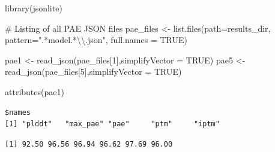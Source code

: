 \documentclass[
  letterpaper,
  DIV=11,
  numbers=noendperiod]{scrartcl}
\newenvironment{Shaded}{\begin{snugshade}}{\end{snugshade}}
\newcommand{\AttributeTok}[1]{\textcolor[rgb]{0.40,0.45,0.13}{#1}}
\newcommand{\CommentTok}[1]{\textcolor[rgb]{0.37,0.37,0.37}{#1}}
\newcommand{\ConstantTok}[1]{\textcolor[rgb]{0.56,0.35,0.01}{#1}}
\newcommand{\DecValTok}[1]{\textcolor[rgb]{0.68,0.00,0.00}{#1}}
\newcommand{\FunctionTok}[1]{\textcolor[rgb]{0.28,0.35,0.67}{#1}}
\newcommand{\NormalTok}[1]{\textcolor[rgb]{0.00,0.23,0.31}{#1}}
\newcommand{\OtherTok}[1]{\textcolor[rgb]{0.00,0.23,0.31}{#1}}
\newcommand{\SpecialCharTok}[1]{\textcolor[rgb]{0.37,0.37,0.37}{#1}}
\newcommand{\StringTok}[1]{\textcolor[rgb]{0.13,0.47,0.30}{#1}}
\begin{document}
\begin{Shaded}
\begin{Highlighting}[]
\FunctionTok{library}\NormalTok{(jsonlite)}

\CommentTok{\# Listing of all PAE JSON files}
\NormalTok{pae\_files }\OtherTok{\textless{}{-}} \FunctionTok{list.files}\NormalTok{(}\AttributeTok{path=}\NormalTok{results\_dir,}
                        \AttributeTok{pattern=}\StringTok{".*model.*}\SpecialCharTok{\textbackslash{}\textbackslash{}}\StringTok{.json"}\NormalTok{,}
                        \AttributeTok{full.names =} \ConstantTok{TRUE}\NormalTok{)}
\end{Highlighting}
\end{Shaded}

\begin{Shaded}
\begin{Highlighting}[]
\NormalTok{pae1 }\OtherTok{\textless{}{-}} \FunctionTok{read\_json}\NormalTok{(pae\_files[}\DecValTok{1}\NormalTok{],}\AttributeTok{simplifyVector =} \ConstantTok{TRUE}\NormalTok{)}
\NormalTok{pae5 }\OtherTok{\textless{}{-}} \FunctionTok{read\_json}\NormalTok{(pae\_files[}\DecValTok{5}\NormalTok{],}\AttributeTok{simplifyVector =} \ConstantTok{TRUE}\NormalTok{)}

\FunctionTok{attributes}\NormalTok{(pae1)}
\end{Highlighting}
\end{Shaded}

\begin{verbatim}
$names
[1] "plddt"   "max_pae" "pae"     "ptm"     "iptm"   
\end{verbatim}

\begin{Shaded}
\end{Shaded}

\begin{verbatim}
[1] 92.50 96.56 96.94 96.62 97.69 96.00
\end{verbatim}

\begin{Shaded}
\end{Shaded}
\end{document}

